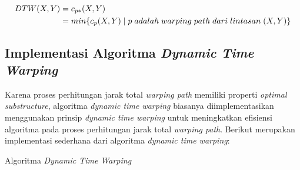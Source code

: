 \vspace{-10pt}

\begin{align*}
    DTW(X, Y) & = c\textsubscript{$p*$}(X, Y) \\
    & = min\{c_p(X, Y)\;|\;p\;adalah\;warping\;path\;dari\;lintasan\;(X, Y)\}
\end{align*}

\subsection{Implementasi Algoritma \textit{Dynamic Time Warping}}

Karena proses perhitungan jarak total \textit{warping path} memiliki properti \textit{optimal substructure}, algoritma \textit{dynamic time warping} biasanya diimplementasikan menggunakan prinsip \textit{dynamic time warping} untuk meningkatkan efisiensi algoritma pada proses perhitungan jarak total \textit{warping path}. Berikut merupakan implementasi sederhana dari algoritma \textit{dynamic time warping}:

\begin{algorithm}
    \caption{Algoritma \textit{Dynamic Time Warping}}
    \DontPrintSemicolon
    
    \label{bab2:dtw-pseudocode}
 
  
    
\end{algorithm}

